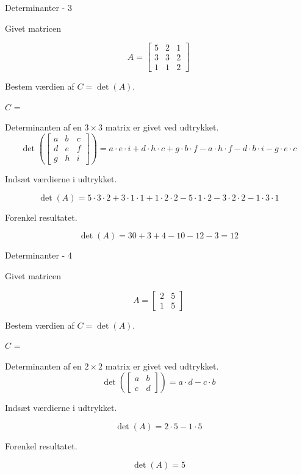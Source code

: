 \documentclass{article}
\begin{document}
\begin{exercise}{Determinanter - 3}

Givet matricen

\[
A = \left[\begin{array}{rrr}
5 & 2 & 1 \\ 
3 & 3 & 2 \\
1 & 1 & 2
\end{array} \right]
\]

Bestem værdien af $C = \det(A)$.

$C$ = 

\hint
Determinanten af en $3 \times 3$ matrix er givet ved udtrykket.
\[
\det \left( \left[\begin{array}{rrr}
a & b & c \\ 
d & e & f \\
g & h & i
\end{array} \right] \right) = a \cdot e \cdot i + d \cdot h \cdot c + g \cdot b \cdot f - a \cdot h \cdot f - d \cdot b \cdot i - g \cdot e \cdot c
\]

\hint
Indsæt værdierne i udtrykket.

\hint
\[
\det \left( A \right) = 5 \cdot 3 \cdot 2 + 3 \cdot 1 \cdot 1 + 1 \cdot 2 \cdot 2 - 5 \cdot 1 \cdot 2 - 3 \cdot 2 \cdot 2 - 1 \cdot 3 \cdot 1
\]

\hint
Forenkel resultatet.

\hint
\[
\det \left( A \right) = 30 + 3 + 4 - 10 - 12 - 3 = 12
\]

\end{exercise}


\begin{exercise}{Determinanter - 4}
	
	Givet matricen
	
	\[
	A = \left[\begin{array}{rr}
	2 & 5 \\ 
	1 & 5 
	\end{array} \right]
	\]
	
	Bestem værdien af $C = \det(A)$.
	
	$C$ = 
	
	\hint
	Determinanten af en $2 \times 2$ matrix er givet ved udtrykket.
	\[
	\det \left( \left[\begin{array}{rr}
	a & b \\ 
	c & d 
	\end{array} \right] \right) = a \cdot d - c \cdot b
	\]
	
	\hint
	Indsæt værdierne i udtrykket.
	
	\hint
	\[
	\det \left( A \right) = 2 \cdot 5 - 1 \cdot 5
	\]
	
	\hint
	Forenkel resultatet.
	
	\hint
	\[
	\det \left( A \right) = 5
	\]
	
\end{exercise}
\end{document}
